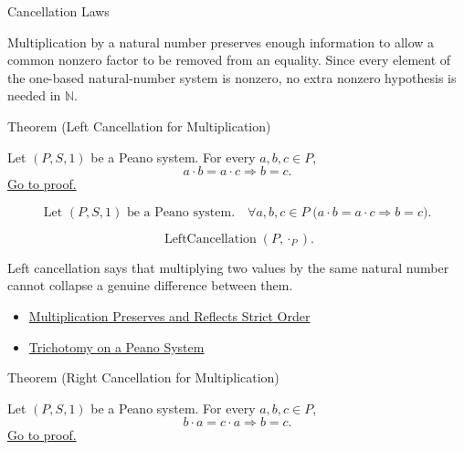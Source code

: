 \begin{topicbox}{Cancellation Laws}
\begin{exposition}
Multiplication by a natural number preserves enough information to allow a
common nonzero factor to be removed from an equality. Since every element of
the one-based natural-number system is nonzero, no extra nonzero hypothesis is
needed in $\mathbb{N}$.
\end{exposition}

\begin{theorembox}{Theorem (Left Cancellation for Multiplication)}
\begin{theorem}
\label{thm:multiplication-left-cancellation}
Let $(P,S,1)$ be a Peano system. For every $a,b,c \in P$,
\[
a\cdot b=a\cdot c
\Longrightarrow
b=c.
\]
\hyperref[prf:multiplication-left-cancellation]{Go to proof.}
\end{theorem}
\end{theorembox}

\begin{remark*}
\[
\text{Let } (P,S,1) \text{ be a Peano system.}\quad
\forall a,b,c \in P\;\bigl(a\cdot b=a\cdot c \Longrightarrow b=c\bigr).
\]
\end{remark*}

\begin{remark*}
\[
\operatorname{LeftCancellation}(P,\cdot_P).
\]
\end{remark*}

\begin{remark*}[Interpretation]
Left cancellation says that multiplying two values by the same natural number
cannot collapse a genuine difference between them.
\end{remark*}

\begin{dependencies}
\begin{itemize}
  \item \hyperref[thm:multiplication-preserves-and-reflects-strict-order]{Multiplication Preserves and Reflects Strict Order}
  \item \hyperref[thm:trichotomy-on-peano-system]{Trichotomy on a Peano System}
\end{itemize}
\end{dependencies}

\begin{theorembox}{Theorem (Right Cancellation for Multiplication)}
\begin{theorem}
\label{thm:multiplication-right-cancellation}
Let $(P,S,1)$ be a Peano system. For every $a,b,c \in P$,
\[
b\cdot a=c\cdot a
\Longrightarrow
b=c.
\]
\hyperref[prf:multiplication-right-cancellation]{Go to proof.}
\end{theorem}
\end{theorembox}


\end{topicbox}

